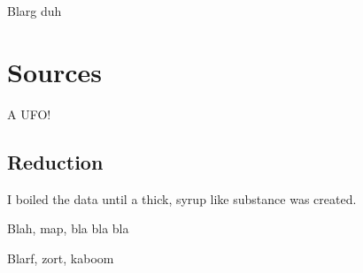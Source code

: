 
Blarg duh \citep{Hatchell02}

\section{Sources}

A UFO!


\subsection{Reduction}

I boiled the data until a thick, syrup like substance was created.

\newpage

Blah, map, bla bla bla

\newpage

Blarf, zort, kaboom
